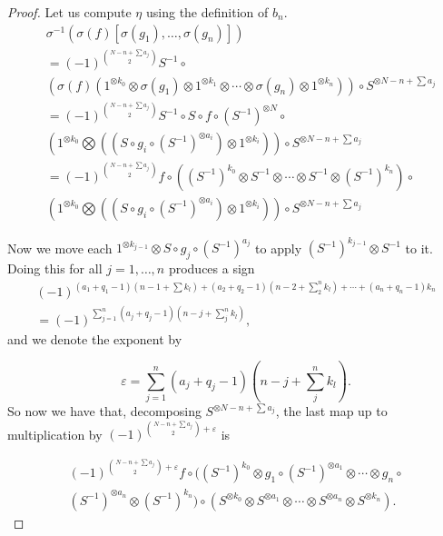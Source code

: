 \documentclass[Thesis.tex]{subfiles}
\begin{document}
\begin{proof}
Let us compute $\eta$ using the definition of $b_n$.
\begin{align*}
&\sigma^{-1}(\sigma(f)[\sigma(g_1),\dots, \sigma(g_n)])\\ &=(-1)^{\binom{N-n+\sum a_j}{2}}S^{-1}\circ\\ 
&(\sigma(f)(1^{\otimes k_0}\otimes \sigma(g_1)\otimes 1^{\otimes k_1}\otimes\cdots\otimes \sigma(g_n)\otimes 1^{\otimes k_n}))\circ S^{\otimes N-n+\sum a_j}\\
&=(-1)^{\binom{N-n+\sum a_j}{2}}S^{-1}\circ S\circ f\circ (S^{-1})^{\otimes N}\circ \\ &\left(1^{\otimes k_0}\bigotimes ((S\circ g_i\circ (S^{-1})^{\otimes a_i})\otimes 1^{\otimes k_i})\right)\circ  S^{\otimes N-n+\sum a_j}\\
&=(-1)^{\binom{N-n+\sum a_j}{2}}f\circ ((S^{-1})^{k_0}\otimes  S^{-1}\otimes\cdots \otimes  S^{-1}\otimes  (S^{-1})^{k_n})\circ\\ 
&\left(1^{\otimes k_0}\bigotimes ((S\circ g_i\circ (S^{-1})^{\otimes a_i})\otimes 1^{\otimes k_i})\right)\circ  S^{\otimes N-n+\sum a_j}
\end{align*}
%


Now we move each $1^{\otimes k_{j-1}}\otimes S\circ g_j\circ (S^{-1})^{a_j}$ to apply $(S^{-1})^{k_{j-1}}\otimes S^{-1}$ to it. Doing this for all $j=1,\dots, n$ produces a sign
\begin{align*}
(-1)^{(a_1+q_1-1)(n-1+\sum k_l)+(a_2+q_2-1)(n-2+\sum_2^n k_l)+\cdots+(a_n+q_n-1)k_n}\\
=(-1)^{\sum_{j=1}^n (a_j+q_j-1)(n-j+\sum_j^n k_l)},
\end{align*}
 and we denote the exponent by
 
 \[\varepsilon=\sum_{j=1}^n (a_j+q_j-1)\left(n-j+\sum_j^n k_l\right).\] So now we have that, decomposing $S^{\otimes N-n+\sum a_j}$, the last map up to multiplication by $(-1)^{\binom{N-n+\sum a_j}{2}+\varepsilon}$ is
 
 \begin{gather*}
 (-1)^{\binom{N-n+\sum a_j}{2}+\varepsilon}f\circ((S^{-1})^{k_0}\otimes  g_1\circ (S^{-1})^{\otimes a_1}\otimes\cdots \otimes  g_n\circ\\ (S^{-1})^{\otimes a_n}\otimes  (S^{-1})^{k_n})\circ (S^{\otimes k_0}\otimes S^{\otimes a_1}\otimes\cdots\otimes S^{\otimes a_n}\otimes S^{\otimes k_n}).
 \end{gather*}
 

\end{proof}
\end{document}
